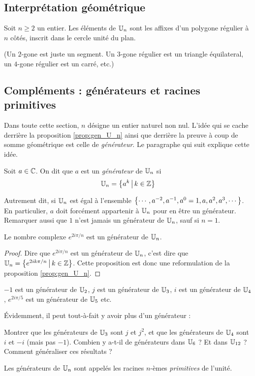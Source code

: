 \subsection{Interprétation géométrique}

\begin{proposition}Soit $n\geq 2$ un entier. 
Les éléments de $\mathbb{U}_n$ sont les affixes d'un polygone régulier à $n$ côtés, inscrit dans le cercle unité du plan.
\end{proposition}

(Un $2$-gone est juste un segment. Un $3$-gone régulier est un triangle équilateral, un $4$-gone régulier est un carré, etc.)


\subsection{Compléments : générateurs et racines primitives}

Dans toute cette section, $n$ désigne un entier naturel non nul. L'idée qui se cache derrière la proposition \ref{prop:gen_U_n} ainsi que derrière la preuve à coup de somme géométrique est celle de \emph{générateur}. Le paragraphe qui suit explique cette idée.

\begin{definition}
Soit $a\in\mathbb{C}$. On dit que $a$ est un \emph{générateur} de $\mathbb{U}_n$ si
\[ \U_n = \ensemble{a^k}{k\in\Z}\]
\end{definition}

Autrement dit, si $\mathbb{U}_n$ est égal à l'ensemble $\left\{\cdots , a^{-2}, a^{-1}, a^0=1, a, a^2, a^3, \cdots\right\}$. En particulier, $a$ doit forcément appartenir à $\mathbb{U}_n$ pour en être un générateur. Remarquer aussi que $1$ n'est jamais un générateur de $\mathbb{U}_n$, sauf si $n=1$.

\begin{proposition}
Le nombre complexe $e^{2i\pi/n}$ est un générateur de $\mathbb{U}_n$.
\end{proposition}
\begin{proof}
Dire que $e^{2i\pi/n}$ est un générateur de $\mathbb{U}_n$, c'est dire que $\U_n=\ensemble{e^{2ik\pi/n}}{k\in \Z}$. Cette proposition est donc une reformulation de la proposition \ref{prop:gen_U_n}.
\end{proof}

\begin{exemples}
$-1$ est un générateur de $\mathbb{U}_2$, $j$ est un générateur de $\mathbb{U}_3$, $i$ est un générateur de $\mathbb{U}_4$, $e^{2i\pi/5}$ est un générateur de $\mathbb{U}_5$ etc.
\end{exemples}

Évidemment, il peut tout-à-fait y avoir plus d'un générateur : 

\begin{exercice}
Montrer que les générateurs de $\mathbb{U}_3$ sont $j$ et $j^2$, et que les générateurs de $\mathbb{U}_4$ sont $i$ et $-i$ (mais pas $-1$). Combien y a-t-il de générateurs dans $\mathbb{U}_6$ ? Et dans $\mathbb{U}_{12}$ ? Comment généraliser ces résultats ?
\end{exercice}

\begin{definition}
Les générateurs de $\mathbb{U}_n$ sont appelés les racines $n$-èmes \emph{primitives} de l'unité.
\end{definition}

